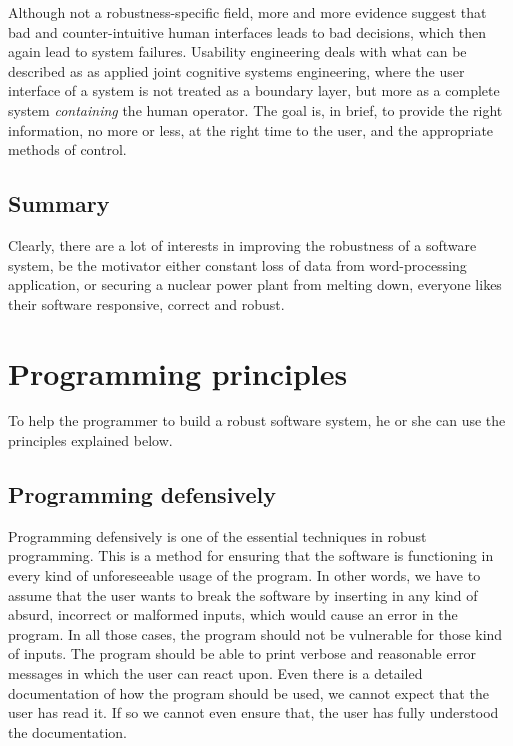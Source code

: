 \documentclass[10pt,a4paper]{article}
\begin{document}
Although not a robustness-specific field, more and more evidence suggest that bad and counter-intuitive human interfaces leads to bad decisions, which then again lead to system failures.
Usability engineering deals with what can be described as as applied joint cognitive systems\cite{hollnagel2005joint} engineering, where the user interface of a system is not treated as a boundary layer, but more as a complete system \emph{containing} the human operator.
The goal is, in brief, to provide the right information, no more or less, at the right time to the user, and the appropriate methods of control.

\subsection{Summary}
Clearly, there are a lot of interests in improving the robustness of a software system, be the motivator either constant loss of data from word-processing application, or securing a nuclear power plant from melting down, everyone likes their software responsive, correct and robust.

\section{Programming principles}

To help the programmer to build a robust software system, he or she can use the principles explained below.

\subsection{Programming defensively}

Programming defensively is one of the essential techniques in robust programming.
This is a method for ensuring that the software is functioning in every kind of unforeseeable usage of the program. In other words, we have to assume that the user wants to break the software by inserting in any kind of absurd, incorrect or malformed inputs, which would cause an error in the program. In all those cases, the program should not be vulnerable for those kind of inputs. The program should be able to print verbose and reasonable error messages in which the user can react upon.
Even there is a detailed documentation of how the program should be used, we cannot expect that the user has read it. If so we cannot even ensure that, the user has fully understood the documentation.\\
\end{document}
